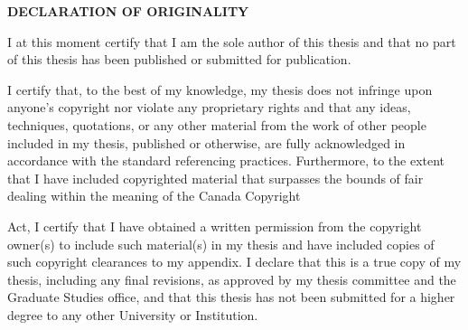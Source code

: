 \newpage
{}
\begin{center}
	\textbf{DECLARATION OF ORIGINALITY}
\end{center}

\par I at this moment certify that I am the sole author of this thesis and that no part of this thesis has been published or submitted for publication.\newline
\par I certify that, to the best of my knowledge, my thesis does not infringe upon anyone's copyright nor violate any proprietary rights and that any ideas, techniques, quotations, or any other material from the work of other people included in my thesis, published or otherwise, are fully acknowledged in accordance with the standard referencing practices. Furthermore, to the extent that I have included copyrighted material that surpasses the bounds of fair dealing within the meaning of the Canada Copyright \par Act, I certify that I have obtained a written permission from the copyright owner(s) to include such material(s) in my thesis and have included copies of such copyright clearances to my appendix.\newline
I declare that this is a true copy of my thesis, including any final revisions, as approved by my thesis committee and the Graduate Studies office, and that this thesis has not been submitted for a higher degree to any other University or Institution.